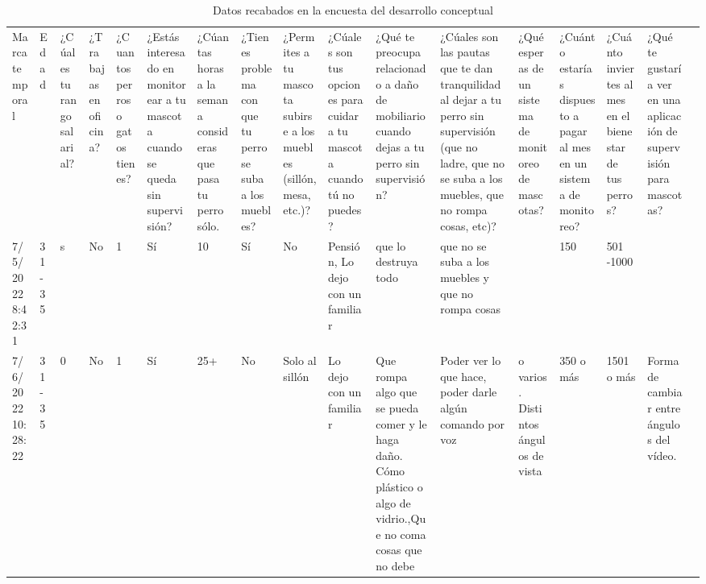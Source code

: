 \newlength{\lanscapetablewidth}
\setlength{\lanscapetablewidth}{1.0\linewidth}
\begin{landscape}
\begin{table}
  \label{tab:encuestas}
  \caption{Datos recabados en la encuesta del desarrollo conceptual}
  \tiny
  \begin{tabular}{
        p{0.059\lanscapetablewidth}p{0.022\lanscapetablewidth}
        p{0.056\lanscapetablewidth}p{0.010\lanscapetablewidth}
        p{0.016\lanscapetablewidth}p{0.018\lanscapetablewidth}
        p{0.03\lanscapetablewidth}p{0.02\lanscapetablewidth}
        p{0.03\lanscapetablewidth}p{0.086\lanscapetablewidth}
        p{0.108\lanscapetablewidth}p{0.125\lanscapetablewidth}
        p{0.149\lanscapetablewidth}p{0.024\lanscapetablewidth}
        p{0.041\lanscapetablewidth}p{0.206\lanscapetablewidth}
        p{0.059\lanscapetablewidth}
    }
    \cline{1-16}
    Marca temporal & Edad & ¿Cúal es tu rango salarial? & 
    ¿Trabajas en oficina? & ¿Cuantos perros o gatos tienes? & 
    ¿Estás interesado en monitorear a tu mascota cuando se queda sin supervisión? & 
    ¿Cúantas horas a la semana consideras que pasa tu perro sólo. & 
    ¿Tienes problema con que tu perro se suba a los muebles? & 
    ¿Permites a tu mascota subirse a los muebles (sillón, mesa, etc.)? & 
    ¿Cúales son tus opciones para cuidar a tu mascota cuando tú no puedes? & 
    ¿Qué te preocupa relacionado a daño de mobiliario cuando dejas a tu perro sin supervisión? & 
    ¿Cúales son las pautas que te dan tranquilidad al dejar a tu perro sin supervisión (que no ladre, que no se suba a los muebles, que no rompa cosas, etc)? & 
    ¿Qué esperas de un sistema de monitoreo de mascotas? & 
    ¿Cuánto estarías dispuesto a pagar al mes en un sistema de monitoreo? & ¿Cuánto inviertes al mes en el bienestar de tus perros? & 
    ¿Qué te gustaría ver en una aplicación de supervisión para mascotas? & \parbox[t]{2mm}{} \\
    7/5/2022 8:42:31 & 31-35 & s & No & 1 & Sí & 10 & Sí & No & Pensión, Lo dejo con un familiar & que lo destruya todo & que no se suba a los muebles y que no rompa cosas  &  & 150 & 501 -1000 & &\\
    7/6/2022 10:28:22 & 31-35 & 0 & No & 1 & Sí & 25+ & No & Solo al sillón & Lo dejo con un familiar & Que rompa algo que se pueda comer y le haga daño. Cómo plástico o algo de vidrio.,Que no coma cosas que no debe & Poder ver lo que hace, poder darle algún comando por voz &  o varios. Distintos ángulos de vista & 350 o más & 1501 o más & Forma de cambiar entre ángulos del vídeo. & \\

\end{tabular}
\end{table}
\end{landscape}
